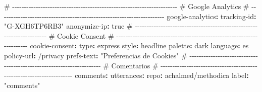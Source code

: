 \documentclass[
  doc,
  floatsintext,
  longtable,
  a4paper,
  nolmodern,
  notxfonts,
  notimes,
  12pt,
  colorlinks=true,linkcolor=blue,citecolor=blue,urlcolor=blue]{apa7}
\newenvironment{Shaded}{\begin{snugshade}}{\end{snugshade}}
\newcommand{\AttributeTok}[1]{\textcolor[rgb]{0.40,0.45,0.13}{#1}}
\newcommand{\CharTok}[1]{\textcolor[rgb]{0.13,0.47,0.30}{#1}}
\newcommand{\CommentTok}[1]{\textcolor[rgb]{0.37,0.37,0.37}{#1}}
\newcommand{\FunctionTok}[1]{\textcolor[rgb]{0.28,0.35,0.67}{#1}}
\newcommand{\KeywordTok}[1]{\textcolor[rgb]{0.00,0.23,0.31}{\textbf{#1}}}
\newcommand{\StringTok}[1]{\textcolor[rgb]{0.13,0.47,0.30}{#1}}
\begin{document}
\begin{Shaded}
\begin{Highlighting}[]
\AttributeTok{  }
\CommentTok{  \# {-}{-}{-}{-}{-}{-}{-}{-}{-}{-}{-}{-}{-}{-}{-}{-}{-}{-}{-}{-}{-}{-}{-}{-}{-}{-}{-}{-}{-}{-}{-}{-}{-}{-}{-}{-}{-}{-}{-}{-}{-}{-}{-}{-}{-}{-}{-}{-}{-}{-}{-}{-}{-}{-}{-}{-}{-}{-}{-}{-}{-}{-}{-}{-}{-}{-}{-}{-}{-}{-}}
\CommentTok{  \# Google Analytics}
\CommentTok{  \# {-}{-}{-}{-}{-}{-}{-}{-}{-}{-}{-}{-}{-}{-}{-}{-}{-}{-}{-}{-}{-}{-}{-}{-}{-}{-}{-}{-}{-}{-}{-}{-}{-}{-}{-}{-}{-}{-}{-}{-}{-}{-}{-}{-}{-}{-}{-}{-}{-}{-}{-}{-}{-}{-}{-}{-}{-}{-}{-}{-}{-}{-}{-}{-}{-}{-}{-}{-}{-}{-}}
\AttributeTok{  }\FunctionTok{google{-}analytics}\KeywordTok{:}
\AttributeTok{    }\FunctionTok{tracking{-}id}\KeywordTok{:}\AttributeTok{ }\StringTok{"G{-}XGH6TP6RB3"}
\AttributeTok{    }\FunctionTok{anonymize{-}ip}\KeywordTok{:}\AttributeTok{ }\CharTok{true}
\AttributeTok{  }
\CommentTok{  \# {-}{-}{-}{-}{-}{-}{-}{-}{-}{-}{-}{-}{-}{-}{-}{-}{-}{-}{-}{-}{-}{-}{-}{-}{-}{-}{-}{-}{-}{-}{-}{-}{-}{-}{-}{-}{-}{-}{-}{-}{-}{-}{-}{-}{-}{-}{-}{-}{-}{-}{-}{-}{-}{-}{-}{-}{-}{-}{-}{-}{-}{-}{-}{-}{-}{-}{-}{-}{-}{-}}
\CommentTok{  \# Cookie Consent}
\CommentTok{  \# {-}{-}{-}{-}{-}{-}{-}{-}{-}{-}{-}{-}{-}{-}{-}{-}{-}{-}{-}{-}{-}{-}{-}{-}{-}{-}{-}{-}{-}{-}{-}{-}{-}{-}{-}{-}{-}{-}{-}{-}{-}{-}{-}{-}{-}{-}{-}{-}{-}{-}{-}{-}{-}{-}{-}{-}{-}{-}{-}{-}{-}{-}{-}{-}{-}{-}{-}{-}{-}{-}}
\AttributeTok{  }\FunctionTok{cookie{-}consent}\KeywordTok{:}
\AttributeTok{    }\FunctionTok{type}\KeywordTok{:}\AttributeTok{ express}
\AttributeTok{    }\FunctionTok{style}\KeywordTok{:}\AttributeTok{ headline}
\AttributeTok{    }\FunctionTok{palette}\KeywordTok{:}\AttributeTok{ dark}
\AttributeTok{    }\FunctionTok{language}\KeywordTok{:}\AttributeTok{ es}
\AttributeTok{    }\FunctionTok{policy{-}url}\KeywordTok{:}\AttributeTok{ /privacy}
\AttributeTok{    }\FunctionTok{prefs{-}text}\KeywordTok{:}\AttributeTok{ }\StringTok{"Preferencias de Cookies"}
\AttributeTok{  }
\CommentTok{  \# {-}{-}{-}{-}{-}{-}{-}{-}{-}{-}{-}{-}{-}{-}{-}{-}{-}{-}{-}{-}{-}{-}{-}{-}{-}{-}{-}{-}{-}{-}{-}{-}{-}{-}{-}{-}{-}{-}{-}{-}{-}{-}{-}{-}{-}{-}{-}{-}{-}{-}{-}{-}{-}{-}{-}{-}{-}{-}{-}{-}{-}{-}{-}{-}{-}{-}{-}{-}{-}{-}}
\CommentTok{  \# Comentarios}
\CommentTok{  \# {-}{-}{-}{-}{-}{-}{-}{-}{-}{-}{-}{-}{-}{-}{-}{-}{-}{-}{-}{-}{-}{-}{-}{-}{-}{-}{-}{-}{-}{-}{-}{-}{-}{-}{-}{-}{-}{-}{-}{-}{-}{-}{-}{-}{-}{-}{-}{-}{-}{-}{-}{-}{-}{-}{-}{-}{-}{-}{-}{-}{-}{-}{-}{-}{-}{-}{-}{-}{-}{-}}
\AttributeTok{  }\FunctionTok{comments}\KeywordTok{:}
\AttributeTok{    }\FunctionTok{utterances}\KeywordTok{:}
\AttributeTok{      }\FunctionTok{repo}\KeywordTok{:}\AttributeTok{ achalmed/methodica}
\AttributeTok{      }\FunctionTok{label}\KeywordTok{:}\AttributeTok{ }\StringTok{"comments"}

\end{Highlighting}
\end{Shaded}
\end{document}

